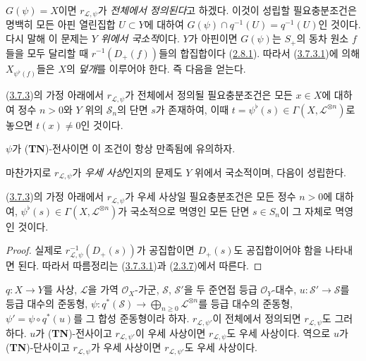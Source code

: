 $G(\psi)=X$이면 $r_{\mathcal{L},\psi}$가 \emph{전체에서 정의된다}고
하겠다. 이것이 성립할 필요충분조건은 명백히 모든 아핀 열린집합
$U\subset Y$에 대하여
$G(\psi)\cap q^{-1}(U)=q^{-1}(U)$인 것이다. 다시 말해 이 문제는
\emph{$Y$ 위에서 국소적}이다. $Y$가 아핀이면 $G(\psi)$는 $S_+$의
동차 원소 $f$들을 모두 달리할 때 $r^{-1}(D_+(f))$들의 합집합이다
(\hyperref[II.2.8.1-ko]{2.8.1}). 따라서
(\hyperref[II.3.7.3.1-ko]{3.7.3.1})에 의해
$X_{\psi^\flat(f)}$들은 $X$의 \emph{덮개}를 이루어야 한다. 즉 다음을
얻는다.

\begin{corollary}[3.7.4]
\label{II.3.7.4-ko}
(\hyperref[II.3.7.3-ko]{3.7.3})의 가정 아래에서
$r_{\mathcal{L},\psi}$가 전체에서 정의될 필요충분조건은 모든
$x\in X$에 대하여 정수 $n>0$와 $Y$ 위의 $\mathcal{S}_n$의 단면
$s$가 존재하여, 이때
$t=\psi^\flat(s)\in\Gamma(X,\mathcal{L}^{\otimes n})$로 놓으면
$t(x)\neq0$인 것이다.
\end{corollary}


$\psi$가 (\textbf{TN})-전사이면 이 조건이 항상 만족됨에 유의하자.

마찬가지로 $r_{\mathcal{L},\psi}$가 \emph{우세 사상}인지의 문제도
$Y$ 위에서 국소적이며, 다음이 성립한다.

\begin{corollary}[3.7.5]
\label{II.3.7.5-ko}
(\hyperref[II.3.7.3-ko]{3.7.3})의 가정 아래에서
$r_{\mathcal{L},\psi}$가 우세 사상일 필요충분조건은 모든 정수
$n>0$에 대하여, $\psi^\flat(s)\in
\Gamma(X,\mathcal{L}^{\otimes n})$가 국소적으로 멱영인 모든 단면
$s\in S_n$이 그 자체로 멱영인 것이다.
\end{corollary}

\begin{proof}
실제로 $r_{\mathcal{L},\psi}^{-1}(D_+(s))$가 공집합이면
$D_+(s)$도 공집합이어야 함을 나타내면 된다. 따라서 따름정리는
(\hyperref[II.3.7.3.1-ko]{3.7.3.1})과
(\hyperref[II.2.3.7-ko]{2.3.7})에서 따른다.
\end{proof}

\begin{proposition}[3.7.6]
\label{II.3.7.6-ko}
$q:X\to Y$를 사상, $\mathcal{L}$을 가역 $\mathcal{O}_X$-가군,
$\mathcal{S}$, $\mathcal{S}'$을 두 준연접 등급
$\mathcal{O}_Y$-대수,
$u:\mathcal{S}'\to\mathcal{S}$를 등급 대수의 준동형,
$\psi:q^*(\mathcal{S})\to\bigoplus_{n\geq0}\mathcal{L}^{\otimes n}$를
등급 대수의 준동형,
$\psi'=\psi\circ q^*(u)$를 그 합성 준동형이라 하자.
$r_{\mathcal{L},\psi'}$이 전체에서 정의되면
$r_{\mathcal{L},\psi}$도 그러하다. $u$가 (\textbf{TN})-전사이고
$r_{\mathcal{L},\psi'}$이 우세 사상이면
$r_{\mathcal{L},\psi}$도 우세 사상이다. 역으로 $u$가
(\textbf{TN})-단사이고 $r_{\mathcal{L},\psi}$가 우세 사상이면
$r_{\mathcal{L},\psi'}$도 우세 사상이다.
\end{proposition}

